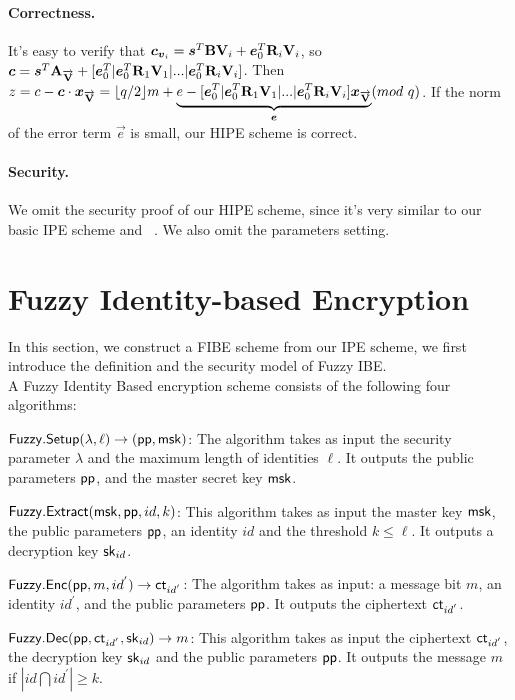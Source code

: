 \paragraph{Correctness.} It's easy to verify that $\boldsymbol{c}_{\boldsymbol{v}_{i}}=\boldsymbol{s}^{T}\mathbf{B}\mathbf{V}_{i}+\boldsymbol{e}^{T}_{0}\mathbf{R}_{i}\mathbf{V}_{i}$, so $\boldsymbol{c}=\boldsymbol{s}^{T}\mathbf{A}_{\overrightarrow{\mathbf{V}}}+[\boldsymbol{e}^{T}_{0}|\boldsymbol{e}^{T}_{0}\mathbf{R}_{1}\mathbf{V}_{1}|...|\boldsymbol{e}^{T}_{0}\mathbf{R}_{i}\mathbf{V}_{i}]$. Then $z=c-\vec{c}\cdot \vec{x}_{\overrightarrow{\mat{V}}}=\lfloor q/2 \rfloor m+\underbrace{e-[\vec{e}^{T}_{0}|\vec{e}^{T}_{0}\mat{R}_{1}\mat{V}_{1}|...|\vec{e}^{T}_{0}\mat{R}_{i}\mat{V}_{i}]\vec{x}_{\overrightarrow{\mat{V}}}}_{\vec{e}}(mod\ q)$. If the norm of the error term $\vec{e}$ is small, our HIPE scheme is correct.

\paragraph{Security.} We omit the security proof of our HIPE scheme, since it's very similar to our basic IPE scheme and ~\cite{LC:AbdDeCMoc12}. We also omit the parameters setting.


\section{Fuzzy Identity-based Encryption}
In this section, we construct a FIBE scheme from our IPE scheme, we first introduce the definition and the security model of Fuzzy IBE.\\[0.4cm]
A Fuzzy Identity Based encryption scheme consists of the following four algorithms:
\begin{description}
 \item $\mathsf{Fuzzy}.\mathsf{Setup}(\lambda, \ell)\rightarrow (\mathsf{pp}, \mathsf{msk})$: The algorithm takes as input the security parameter $\lambda$ and the maximum length of identities $\ell$. It outputs the public parameters $\mathsf{pp}$, and the master secret key $\mathsf{msk}$.
 \item $\mathsf{Fuzzy}.\mathsf{Extract}(\mathsf{msk}, \mathsf{pp}, id, k)$: This algorithm takes as input the master key $\mathsf{msk}$, the public parameters $\mathsf{pp}$, an identity $id$ and the threshold  $k\leq \ell$. It outputs a decryption key $\mathsf{sk}_{id}$.
 \item $\mathsf{Fuzzy}.\mathsf{Enc}(\mathsf{pp}, m, id^{'}) \rightarrow \mathsf{ct}_{id^{'}}$: The algorithm takes as input: a message bit $m$, an identity $id^{'}$, and the public parameters $\mathsf{pp}$. It outputs the ciphertext $\mathsf{ct}_{id^{'}}$.
 \item $\mathsf{Fuzzy}.\mathsf{Dec}(\mathsf{pp}, \mathsf{ct}_{id^{'}}, \mathsf{sk}_{id})\rightarrow m$: This algorithm takes as input the ciphertext $\mathsf{ct}_{id^{'}}$, the decryption key $\mathsf{sk}_{id}$ and the public parameters $\mathsf{pp}$. It outputs the message $m$ if $|id \bigcap id^{'}| \geq k$.
\end{description}
